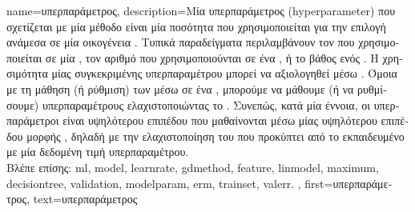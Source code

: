 {name={\foreignlanguage{greek}{υπερπαράμετρος}},
	description={\foreignlanguage{greek}{Μία υπερπαράμετρος} (hyperparameter) 
		\foreignlanguage{greek}{που σχετίζεται με μία μέθοδο}  \foreignlanguage{greek}{είναι μία ποσότητα που χρησιμοποιείται για 
		την επιλογή ανάμεσα σε μία οικογένεια} . \foreignlanguage{greek}{Τυπικά παραδείγματα περιλαμβάνουν τον}
		 \foreignlanguage{greek}{που χρησιμοποιείται σε μία} , \foreignlanguage{greek}{τον 
		αριθμό}  \foreignlanguage{greek}{που χρησιμοποιούνται σε ένα} , \foreignlanguage{greek}{ή 
		το}  \foreignlanguage{greek}{βάθος ενός} . \foreignlanguage{greek}{Η χρησιμότητα 
		μίας συγκεκριμένης υπερπαραμέτρου μπορεί να αξιολογηθεί μέσω} . \foreignlanguage{greek}{Όμοια με τη μάθηση 
		(ή ρύθμιση) των}  \foreignlanguage{greek}{μέσω}  \foreignlanguage{greek}{σε ένα} 
		, \foreignlanguage{greek}{μπορούμε να μάθουμε (ή να ρυθμίσουμε) υπερπαραμέτρους ελαχιστοποιώντας το} 
		. \foreignlanguage{greek}{Συνεπώς, κατά μία έννοια, οι υπερπαράμετροι είναι}  
		\foreignlanguage{greek}{υψηλότερου επιπέδου που μαθαίνονται μέσω μίας υψηλότερου επιπέδου μορφής} , 
		\foreignlanguage{greek}{δηλαδή με την ελαχιστοποίηση του}  \foreignlanguage{greek}{που προκύπτει από το εκπαιδευμένο} 
		 \foreignlanguage{greek}{με μία δεδομένη τιμή υπερπαραμέτρου}. 
			\\ 
		\foreignlanguage{greek}{Βλέπε επίσης:} \gls{ml}, \gls{model}, \gls{learnrate}, \gls{gdmethod}, \gls{feature}, \gls{linmodel}, 
		\gls{maximum}, \gls{decisiontree}, \gls{validation}, \gls{modelparam}, \gls{erm}, \gls{trainset}, \gls{valerr}. },
	first={\foreignlanguage{greek}{υπερπαράμετρος}},
	text={\foreignlanguage{greek}{υπερπαράμετρος}}
}

